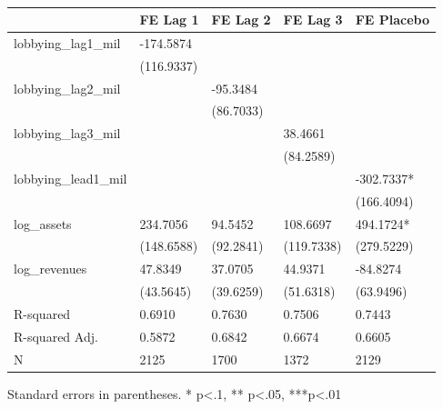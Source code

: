 \begin{table}
\caption{}
\label{}
\begin{center}
\begin{tabular}{lllll}
\hline
                     & FE Lag 1   & FE Lag 2  & FE Lag 3   & FE Placebo  \\
\hline
lobbying\_lag1\_mil  & -174.5874  &           &            &             \\
                     & (116.9337) &           &            &             \\
lobbying\_lag2\_mil  &            & -95.3484  &            &             \\
                     &            & (86.7033) &            &             \\
lobbying\_lag3\_mil  &            &           & 38.4661    &             \\
                     &            &           & (84.2589)  &             \\
lobbying\_lead1\_mil &            &           &            & -302.7337*  \\
                     &            &           &            & (166.4094)  \\
log\_assets          & 234.7056   & 94.5452   & 108.6697   & 494.1724*   \\
                     & (148.6588) & (92.2841) & (119.7338) & (279.5229)  \\
log\_revenues        & 47.8349    & 37.0705   & 44.9371    & -84.8274    \\
                     & (43.5645)  & (39.6259) & (51.6318)  & (63.9496)   \\
R-squared            & 0.6910     & 0.7630    & 0.7506     & 0.7443      \\
R-squared Adj.       & 0.5872     & 0.6842    & 0.6674     & 0.6605      \\
N                    & 2125       & 1700      & 1372       & 2129        \\
\hline
\end{tabular}
\end{center}
\end{table}
\bigskip
Standard errors in parentheses. \newline 
* p<.1, ** p<.05, ***p<.01